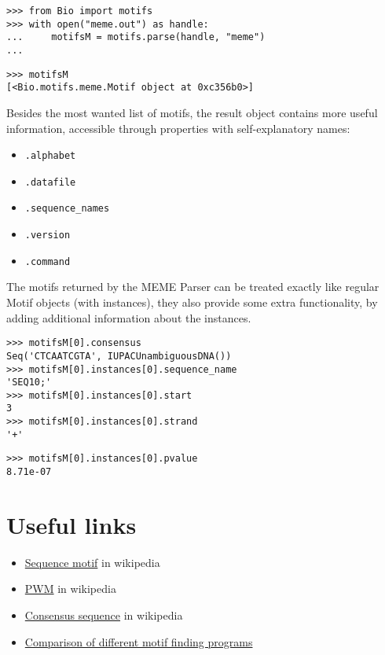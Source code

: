 \begin{verbatim}
>>> from Bio import motifs
>>> with open("meme.out") as handle:
...     motifsM = motifs.parse(handle, "meme")
...
\end{verbatim}
\begin{verbatim}
>>> motifsM
[<Bio.motifs.meme.Motif object at 0xc356b0>]
\end{verbatim}

Besides the most wanted list of motifs, the result object contains more useful information, accessible through properties with self-explanatory names:
\begin{itemize}
\item \verb|.alphabet|
\item \verb|.datafile|
\item \verb|.sequence_names|
\item \verb|.version|
\item \verb|.command|
\end{itemize}

The motifs returned by the MEME Parser can be treated exactly like regular
Motif objects (with instances), they also provide some extra
functionality, by adding additional information about the instances.

\begin{verbatim}
>>> motifsM[0].consensus
Seq('CTCAATCGTA', IUPACUnambiguousDNA())
>>> motifsM[0].instances[0].sequence_name
'SEQ10;'
>>> motifsM[0].instances[0].start
3
>>> motifsM[0].instances[0].strand
'+'
\end{verbatim}
\begin{verbatim}
>>> motifsM[0].instances[0].pvalue
8.71e-07
\end{verbatim}


\section{Useful links}
\label{sec:links}


\begin{itemize}
\item \href{https://en.wikipedia.org/wiki/Sequence_motif}{Sequence motif} in wikipedia
\item \href{https://en.wikipedia.org/wiki/Position_weight_matrix}{PWM} in wikipedia
\item \href{https://en.wikipedia.org/wiki/Consensus_sequence}{Consensus sequence} in wikipedia
\item \href{http://bio.cs.washington.edu/assessment/}{Comparison of different motif finding programs}
\end{itemize}


